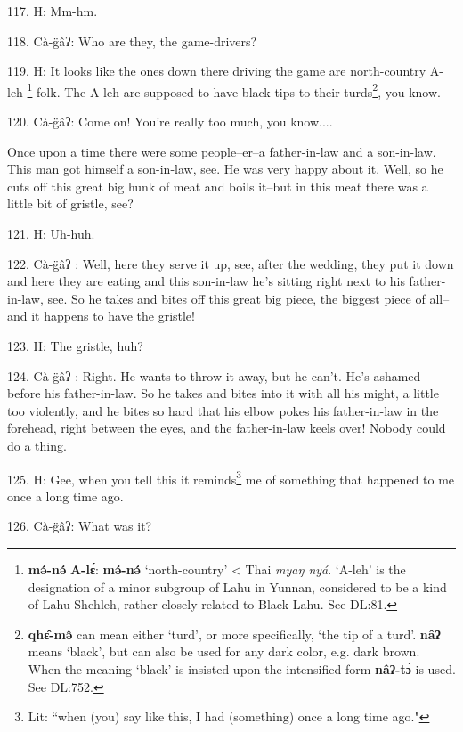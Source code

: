 117. H: Mm-hm.

118. Cà-g̈âʔ: Who are they, the game-drivers?

119. H: It looks like the ones down there driving the game are north-country A-leh
\footnote{\textbf{mə́-nə́} \textbf{A-lɛ́}: \textbf{mə́-nə́} `north-country' < Thai \textit{myaŋ nyá}. `A-leh' is the designation of a minor subgroup of Lahu in Yunnan, considered to be a kind of Lahu Shehleh, rather closely related to Black Lahu. See DL:81.} folk. The A-leh are supposed to have black tips to their turds\footnote{\textbf{qhɛ̂-mə̂} can mean either `turd', or more specifically, `the tip of a turd'. \textbf{nâʔ} means `black', but can also be used for any dark color, e.g. dark brown. When the meaning `black' is insisted upon the intensified form \textbf{nâʔ-tɔ́} is used. See DL:752.}, you know.

120. Cà-g̈âʔ: Come on! You're really too much, you know....

\begin{center}
\end{center}

Once upon a time there were some people--er--a father-in-law and a son-in-law.
This man got himself a son-in-law, see. He was very happy about it. Well, so he
cuts off this great big hunk of meat and boils it--but in this meat there was a
little bit of gristle, see?

121. H: Uh-huh.

122. Cà-g̈âʔ : Well, here they serve it up, see, after the wedding, they put
it down and here they are eating and this son-in-law he's sitting right next to
his father-in-law, see. So he takes and bites off this great big piece, the biggest
piece of all--and it happens to have the gristle!

123. H: The gristle, huh?

124. Cà-g̈âʔ : Right. He wants to throw it away, but he can't. He's ashamed
before his father-in-law. So he takes and bites into it with all his might, a little
too violently, and he bites so hard that his elbow pokes his father-in-law in the
forehead, right between the eyes, and the father-in-law keels over! Nobody could
do a thing.

125. H: Gee, when you tell this it reminds\footnote{Lit: ``when (you) say like this, I had (something) once a long time ago."} me of something that happened to
me once a long time ago.

126. Cà-g̈âʔ: What was it?


